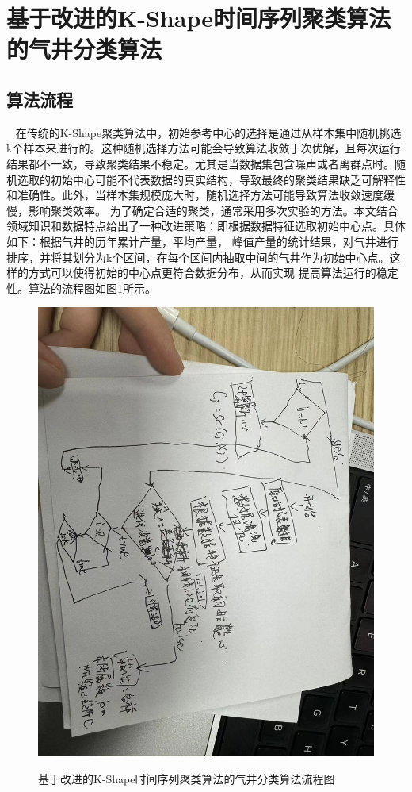 \section{基于改进的K-Shape时间序列聚类算法的气井分类算法}
\subsection{算法流程}\
\label{sec:K-Shapeprocess}
在传统的K-Shape聚类算法中，初始参考中心的选择是通过从样本集中随机挑选k个样本来进行的。这种随机选择方法可能会导致算法收敛于次优解，且每次运行结果都不一致，导致聚类结果不稳定。尤其是当数据集包含噪声或者离群点时。随机选取的初始中心可能不代表数据的真实结构，导致最终的聚类结果缺乏可解释性和准确性。此外，当样本集规模庞大时，随机选择方法可能导致算法收敛速度缓慢，影响聚类效率。
为了确定合适的聚类，通常采用多次实验的方法。本文结合领域知识和数据特点给出了一种改进策略：即根据数据特征选取初始中心点。具体如下：根据气井的历年累计产量，平均产量，
峰值产量的统计结果，对气井进行排序，并将其划分为k个区间，在每个区间内抽取中间的气井作为初始中心点。这样的方式可以使得初始的中心点更符合数据分布，从而实现
提高算法运行的稳定性。算法的流程图如图\ref{fig:K-Shape}所示。
\begin{figure}
    \centering
    \includegraphics[scale=0.15,angle=0]{figure/K-Shape.jpg}\\
    \caption{基于改进的K-Shape时间序列聚类算法的气井分类算法流程图}
    \label{fig:K-Shape}
\end{figure}
